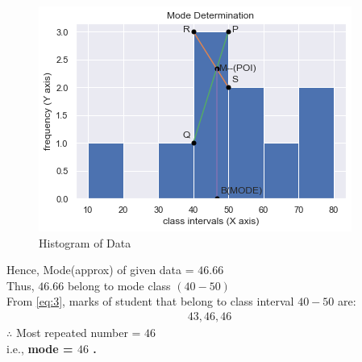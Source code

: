 \documentclass[journal,12pt,twocolumn]{IEEEtran}
\begin{document}
\begin{flushleft}
\begin{enumerate}
	\begin{figure}[H]
		\centering
			\includegraphics[width=\columnwidth]{figs/graph.png}
			\caption{Histogram of Data}
			\label{Fig2}	
	\end{figure}	
Hence, Mode(approx) of given data = $46.66$\\[8pt]
Thus, $46.66$ belong to mode class $(40-50)$\\[5pt]
From \eqref{eq:3}, marks of student that belong to class interval $40-50$ are:
	\begin{align*}
		43,46,46
	\end{align*}
$\therefore$ Most repeated number = $46$\\[8pt]
i.e., \textbf{mode = $46$ .}\\
\end{enumerate}
\end{flushleft}
\end{document}
